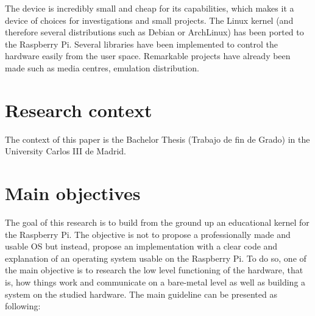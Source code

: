 The device is incredibly small and cheap for its capabilities, which makes it a device of choices for investigations and small projects. The Linux kernel (and therefore several distributions such as Debian or ArchLinux) has been ported to the Raspberry Pi. Several libraries have been implemented to control the hardware easily from the user space. Remarkable projects have already been made such as media centres\cite{osmc}, emulation distribution\cite{retropie}.


\section{Research context}
The context of this paper is the Bachelor Thesis (Trabajo de fin de Grado) in the University Carlos III de Madrid.


\section{Main objectives}

The goal of this research is to build from the ground up an educational kernel for the Raspberry Pi. The objective is not to propose a professionally made and usable OS but instead, propose an implementation with a clear code and explanation of an operating system usable on the Raspberry Pi. To do so, one of the main objective is to research the low level functioning of the hardware, that is, how things work and communicate on a bare-metal level as well as building a system on the studied hardware. The main guideline can be presented as following:

